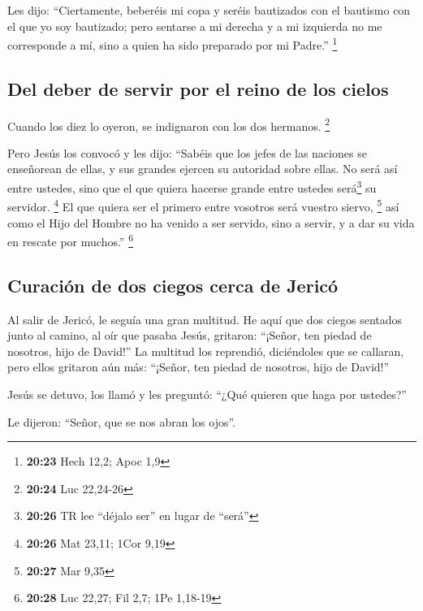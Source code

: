 \begin{paracol}{2}
 Les dijo: ``Ciertamente, beberéis mi copa y seréis
bautizados con el bautismo con el que yo soy bautizado; pero sentarse a
mi derecha y a mi izquierda no me corresponde a mí, sino a quien ha sido
preparado por mi Padre.'' \footnote{\textbf{20:23} Hech 12,2; Apoc 1,9}

\hypertarget{del-deber-de-servir-por-el-reino-de-los-cielos}{%
\subsection{Del deber de servir por el reino de los
cielos}\label{del-deber-de-servir-por-el-reino-de-los-cielos}}

 Cuando los diez lo oyeron, se indignaron con los dos
hermanos. \footnote{\textbf{20:24} Luc 22,24-26}

 Pero Jesús los convocó y les dijo: ``Sabéis que los
jefes de las naciones se enseñorean de ellas, y sus grandes ejercen su
autoridad sobre ellas.  No será así entre ustedes, sino
que el que quiera hacerse grande entre ustedes será\footnote{\textbf{20:26}
  TR lee ``déjalo ser'' en lugar de ``será''} su servidor. \footnote{\textbf{20:26}
  Mat 23,11; 1Cor 9,19}  El que quiera ser el primero
entre vosotros será vuestro siervo, \footnote{\textbf{20:27} Mar 9,35}
 así como el Hijo del Hombre no ha venido a ser servido,
sino a servir, y a dar su vida en rescate por muchos.'' \footnote{\textbf{20:28}
  Luc 22,27; Fil 2,7; 1Pe 1,18-19}

\hypertarget{curaciuxf3n-de-dos-ciegos-cerca-de-jericuxf3}{%
\subsection{Curación de dos ciegos cerca de
Jericó}\label{curaciuxf3n-de-dos-ciegos-cerca-de-jericuxf3}}

 Al salir de Jericó, le seguía una gran multitud.
 He aquí que dos ciegos sentados junto al camino, al oír
que pasaba Jesús, gritaron: ``¡Señor, ten piedad de nosotros, hijo de
David!''  La multitud los reprendió, diciéndoles que se
callaran, pero ellos gritaron aún más: ``¡Señor, ten piedad de nosotros,
hijo de David!''

 Jesús se detuvo, los llamó y les preguntó: ``¿Qué
quieren que haga por ustedes?''

 Le dijeron: ``Señor, que se nos abran los ojos''.


\end{paracol}
